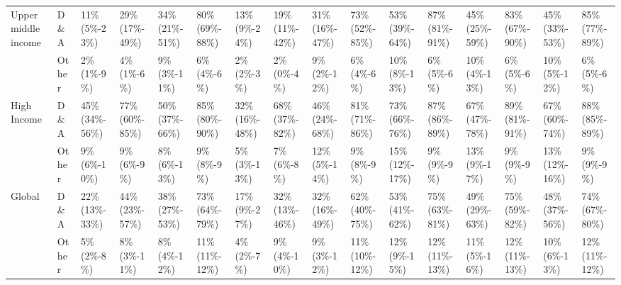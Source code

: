 \begin{tabular}{ll p{1cm} p{1cm} p{1cm} p{1cm} p{1cm} p{1cm} p{1cm} p{1cm} p{1cm} p{1cm} p{1cm} p{1cm} p{1cm} p{1cm}}
Upper middle income & D\&A &               11\% \mbox{(5\%-23\%)} &  29\% \mbox{(17\%-49\%)} &          34\% \mbox{(21\%-51\%)} &  80\% \mbox{(69\%-88\%)} &         13\% \mbox{(9\%-24\%)} &  19\% \mbox{(11\%-42\%)} &                 31\% \mbox{(16\%-47\%)} &  73\% \mbox{(52\%-85\%)} &       53\% \mbox{(39\%-64\%)} &  87\% \mbox{(81\%-91\%)} &  45\% \mbox{(25\%-59\%)} &  83\% \mbox{(67\%-90\%)} &  45\% \mbox{(33\%-53\%)} &  85\% \mbox{(77\%-89\%)} \\
       & Other &                 2\% \mbox{(1\%-9\%)} &     4\% \mbox{(1\%-6\%)} &            9\% \mbox{(3\%-11\%)} &     6\% \mbox{(4\%-6\%)} &           2\% \mbox{(2\%-3\%)} &     2\% \mbox{(0\%-4\%)} &                   9\% \mbox{(2\%-12\%)} &     6\% \mbox{(4\%-6\%)} &        10\% \mbox{(8\%-13\%)} &     6\% \mbox{(5\%-6\%)} &   10\% \mbox{(4\%-13\%)} &     6\% \mbox{(5\%-6\%)} &   10\% \mbox{(5\%-12\%)} &     6\% \mbox{(5\%-6\%)} \\
High Income & D\&A &              45\% \mbox{(34\%-56\%)} &  77\% \mbox{(60\%-85\%)} &          50\% \mbox{(37\%-66\%)} &  85\% \mbox{(80\%-90\%)} &        32\% \mbox{(16\%-48\%)} &  68\% \mbox{(37\%-82\%)} &                 46\% \mbox{(24\%-68\%)} &  81\% \mbox{(71\%-86\%)} &       73\% \mbox{(66\%-76\%)} &  87\% \mbox{(86\%-89\%)} &  67\% \mbox{(47\%-78\%)} &  89\% \mbox{(81\%-91\%)} &  67\% \mbox{(60\%-74\%)} &  88\% \mbox{(85\%-89\%)} \\
       & Other &                9\% \mbox{(6\%-10\%)} &     9\% \mbox{(6\%-9\%)} &            8\% \mbox{(6\%-13\%)} &     9\% \mbox{(8\%-9\%)} &          5\% \mbox{(3\%-13\%)} &     7\% \mbox{(6\%-8\%)} &                  12\% \mbox{(5\%-14\%)} &     9\% \mbox{(8\%-9\%)} &       15\% \mbox{(12\%-17\%)} &     9\% \mbox{(9\%-9\%)} &   13\% \mbox{(9\%-17\%)} &     9\% \mbox{(9\%-9\%)} &  13\% \mbox{(12\%-16\%)} &     9\% \mbox{(9\%-9\%)} \\
Global & D\&A &              22\% \mbox{(13\%-33\%)} &  44\% \mbox{(23\%-57\%)} &          38\% \mbox{(27\%-53\%)} &  73\% \mbox{(64\%-79\%)} &         17\% \mbox{(9\%-27\%)} &  32\% \mbox{(13\%-46\%)} &                 32\% \mbox{(16\%-49\%)} &  62\% \mbox{(40\%-75\%)} &       53\% \mbox{(41\%-62\%)} &  75\% \mbox{(63\%-81\%)} &  49\% \mbox{(29\%-63\%)} &  75\% \mbox{(59\%-82\%)} &  48\% \mbox{(37\%-56\%)} &  74\% \mbox{(67\%-80\%)} \\
       & Other &                 5\% \mbox{(2\%-8\%)} &    8\% \mbox{(3\%-11\%)} &            8\% \mbox{(4\%-12\%)} &  11\% \mbox{(11\%-12\%)} &           4\% \mbox{(2\%-7\%)} &    9\% \mbox{(4\%-10\%)} &                   9\% \mbox{(3\%-12\%)} &  11\% \mbox{(10\%-12\%)} &        12\% \mbox{(9\%-15\%)} &  12\% \mbox{(11\%-13\%)} &   11\% \mbox{(5\%-16\%)} &  12\% \mbox{(11\%-13\%)} &   10\% \mbox{(6\%-13\%)} &  12\% \mbox{(11\%-12\%)} \\
\bottomrule
\end{tabular}
